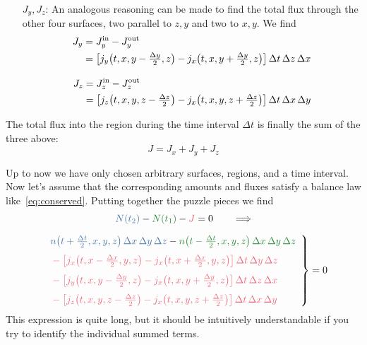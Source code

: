 \documentclass[a4paper,12pt,%
onecolumn,oneside,titlepage,%
british%
]{memoir}
\newcommand*{\incr}{\Delta}%
\renewcommand*{\|}[1][]{\nonscript\:#1\vert\nonscript\:\mathopen{}}
\newcommand*{\yN}{N}
\newcommand*{\yJ}{J}
\newcommand*{\Dt}{\incr t}
\newcommand*{\Dx}{\incr x}
\newcommand*{\Dy}{\incr y}
\newcommand*{\Dz}{\incr z}
\newcommand*{\Dth}{\tfrac{\incr t}{2}}
\newcommand*{\Dxh}{\tfrac{\incr x}{2}}
\newcommand*{\Dyh}{\tfrac{\incr y}{2}}
\newcommand*{\Dzh}{\tfrac{\incr z}{2}}
\begin{document}
\begin{itemize}
\begin{itemize}
  \item[$\yJ_{y}, \yJ_{z}$:] An analogous reasoning can be made to find the total flux through the other four surfaces, two parallel to $z,y$ and two to $x,y$. We find
    \begin{align}
      \label{eq:Fyflux}
      \begin{split}
        \yJ_{y} &= \yJ_{y}^{\text{in}} - \yJ_{y}^{\text{out}}
        \\&= \bigl[ j_{y}\bigl(t, x, y-\Dyh, z\bigr) - j_{x}\bigl(t, x, y+\Dyh, z\bigr)\bigr]
        \,\Dt\,\Dz\,\Dx
      \end{split}
      \\[3\jot]
      \label{eq:Fzflux}
      \begin{split}
        \yJ_{z} &= \yJ_{z}^{\text{in}} - \yJ_{z}^{\text{out}}
        \\&= \bigl[ j_{z}\bigl(t, x, y, z-\Dzh\bigr) - j_{x}\bigl(t, x, y, z+\Dzh\bigr)\bigr]
        \,\Dt\,\Dx\,\Dy
      \end{split}
    \end{align}
  \end{itemize}
The total flux into the region during the time interval $\Dt$ is finally the sum of the three above:
\begin{equation}
  \label{eq:Fflux}
  \yJ = \yJ_{x} + \yJ_{y} + \yJ_{z}
\end{equation}
\end{itemize}

Up to now we have only chosen arbitrary surfaces, regions, and a time interval. Now let's assume that the corresponding amounts and fluxes satisfy a balance law like~\eqref{eq:conserved}. Putting together the puzzle pieces we find
\begin{multline*}
  \label{eq:balance_pieces}
    \mathcolor{blue}{\yN(t_{2})} -\mathcolor{green}{\yN(t_{1})} - \mathcolor{red}{\yJ} = 0 \qquad     \Longrightarrow
    \\[2\jot]
    \left.\begin{aligned}
      &\mathcolor{blue}{n\bigl(t+\Dth, x,y,z\bigr)\,\Dx\,\Dy\,\Dz}
      - \mathcolor{green}{n\bigl(t-\Dth, x,y,z\bigr)\,\Dx\,\Dy\,\Dz}
      \\[\jot]\quad&\color{red}-\bigl[ j_{x}\bigl(t, x-\Dxh, y, z\bigr) - j_{x}\bigl(t, x+\Dxh, y, z\bigr)\bigr]
      \,\Dt\,\Dy\,\Dz
      \\[\jot]\quad&\color{red}-\bigl[ j_{y}\bigl(t, x, y-\Dyh, z\bigr) - j_{x}\bigl(t, x, y+\Dyh, z\bigr)\bigr]
      \,\Dt\,\Dz\,\Dx
      \\[\jot]\quad&\color{red}-\bigl[ j_{z}\bigl(t, x, y, z-\Dzh\bigr) - j_{x}\bigl(t, x, y, z+\Dzh\bigr)\bigr]
      \,\Dt\,\Dx\,\Dy
    \end{aligned}\enspace\right\}=0
\end{multline*}
This expression is quite long, but it should be intuitively understandable if you try to identify the individual summed terms.
\end{document}

